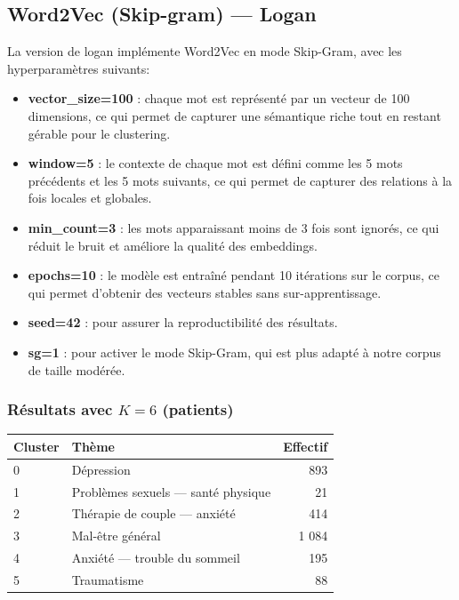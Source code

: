 \documentclass[12pt,a4paper]{report}
\begin{document}
\pagebreak

\subsection{Word2Vec (Skip-gram) — Logan}
La version de logan implémente Word2Vec en mode Skip-Gram, avec les hyperparamètres suivants:
\begin{itemize}
  \item \textbf{vector\_size=100} : chaque mot est représenté par un vecteur de 100 dimensions, ce qui permet de capturer une sémantique riche tout en restant gérable pour le clustering.
  \item \textbf{window=5} : le contexte de chaque mot est défini comme les 5 mots précédents et les 5 mots suivants, ce qui permet de capturer des relations à la fois locales et globales.
  \item \textbf{min\_count=3} : les mots apparaissant moins de 3 fois sont ignorés, ce qui réduit le bruit et améliore la qualité des embeddings.
  \item \textbf{epochs=10} : le modèle est entraîné pendant 10 itérations sur le corpus, ce qui permet d'obtenir des vecteurs stables sans sur-apprentissage.
  \item \textbf{seed=42} : pour assurer la reproductibilité des résultats.
  \item \textbf{sg=1} : pour activer le mode Skip-Gram, qui est plus adapté à notre corpus de taille modérée.
\end{itemize}


\subsubsection*{Résultats avec $K = 6$ (patients)}

\begin{center}
\begin{tabular}{llr}
\toprule
\textbf{Cluster} & \textbf{Thème} & \textbf{Effectif} \\
\midrule
0 & Dépression & 893 \\
1 & Problèmes sexuels — santé physique & 21 \\
2 & Thérapie de couple — anxiété & 414 \\
3 & Mal-être général & 1 084 \\
4 & Anxiété — trouble du sommeil & 195 \\
5 & Traumatisme & 88 \\
\bottomrule
\end{tabular}
\end{center}
\end{document}
